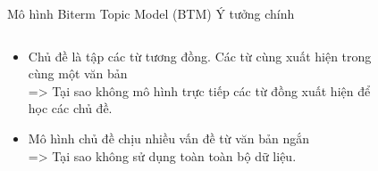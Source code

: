 \documentclass[pdf]{beamer}
\begin{document}
\begin{frame}{Mô hình Biterm Topic Model (BTM)}
Ý tưởng chính
\begin{columns}[T] %
	\begin{column}{.55\textwidth}
		\begin{itemize}
		\item Chủ đề là tập các từ tương đồng. Các từ cùng xuất hiện trong cùng một văn bản
		\\=> Tại sao không mô hình trực tiếp các từ đồng xuất hiện để học các chủ đề.
		\item Mô hình chủ đề chịu nhiều vấn đề từ văn bản ngắn 
		\\=> Tại sao không sử dụng toàn toàn bộ dữ liệu.
		\end{itemize}
	\end{column} %
	\hfill%
	\begin{column}{.43\textwidth}
		\begin{figure}
		\end{figure}				
	\end{column} %
\end{columns}

\end{frame}
\end{document}
